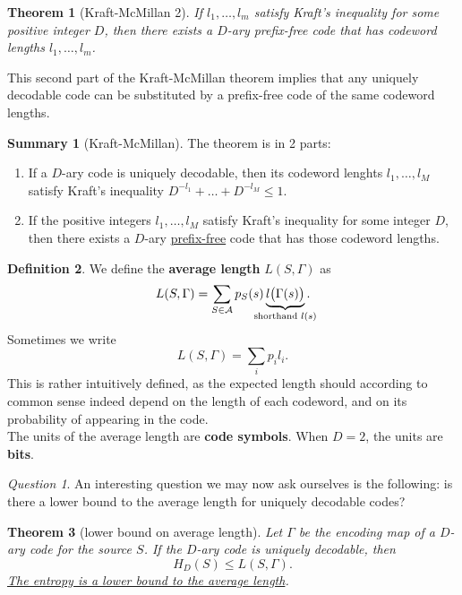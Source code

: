 \documentclass{report}
\theoremstyle{plain}
\newtheorem{thm}{Theorem}
\theoremstyle{definition}
\newtheorem{defn}[thm]{Definition}
\newtheorem*{summary}{Summary}
\theoremstyle{remark}
\newtheorem*{question}{Question}
\begin{document}
\begin{thm}[Kraft-McMillan 2]
If $l_1, \ldots, l_m$ satisfy Kraft's inequality for some positive integer $D$, then there exists a $D$-ary prefix-free code that has codeword  lengths $l_1, \ldots, l_m$.
\end{thm}

This second part of the Kraft-McMillan theorem implies that any uniquely decodable code can be substituted by a prefix-free code of the same codeword lengths.
\begin{summary}[Kraft-McMillan] The theorem is in 2 parts: \\
	\begin{enumerate}
		\item If a $D$-ary code is uniquely decodable, then its codeword lenghts $l_1, \ldots, l_M$ satisfy Kraft's inequality $D^{-l_1} + \dots + D^{-l_M} \leq 1$.
		\item If the positive integers $l_1, \ldots, l_M$ satisfy Kraft's inequality for some integer $D$, then there exists a $D$-ary \ul{prefix-free} code that has those codeword lengths.
	\end{enumerate}
\end{summary}

\begin{defn}
We define the \textbf{average length} $L(S, \Gamma)$ as
	\begin{equation}
		L(S, \Gamma) = \sum_{S \in \mathcal A} p_S(s) \underbrace{l \bigl(\Gamma(s)\bigr)}_{{\mathclap{\text{shorthand } l(s)}}}.
	\end{equation}
	Sometimes we write
	\begin{equation}
		L(S, \Gamma) = \sum_i p_i l_i.
	\end{equation}
This is rather intuitively defined, as the expected length should according to common sense indeed depend on the length of each codeword, and on its probability of appearing in the code. \\
The units of the average length are \textbf{code symbols}. When $D = 2$, the units are \textbf{bits}.
\end{defn}

\begin{question}
An interesting question we may now ask ourselves is the following: is there a lower bound to the average length for uniquely decodable codes?
\end{question}

\begin{thm}[lower bound on average length]
	Let $\Gamma$ be the encoding map of a $D$-ary code for the source $S$. If the $D$-ary code is uniquely decodable, then
	\begin{equation}
		H_D(S) \leq L(S, \Gamma).
	\end{equation}
	\ul{The entropy is a lower bound to the average length}.
\end{thm}
\end{document}
